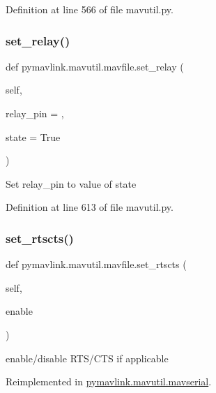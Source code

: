 Definition at line 566 of file mavutil.\+py.

\mbox{\label{classpymavlink_1_1mavutil_1_1mavfile_adefc4e0924a50a82a42a49e790cfe19a}} 
\subsubsection{\texorpdfstring{set\_relay()}{set\_relay()}}
{\footnotesize\ttfamily def pymavlink.\+mavutil.\+mavfile.\+set\+\_\+relay (\begin{DoxyParamCaption}\item[{}]{self,  }\item[{}]{relay\+\_\+pin = {},  }\item[{}]{state = {\ttfamily True} }\end{DoxyParamCaption})}

\begin{DoxyVerb}Set relay_pin to value of state\end{DoxyVerb}
 

Definition at line 613 of file mavutil.\+py.

\mbox{\label{classpymavlink_1_1mavutil_1_1mavfile_a2607aae0fda1190034889d9e1c585539}} 
\subsubsection{\texorpdfstring{set\_rtscts()}{set\_rtscts()}}
{\footnotesize\ttfamily def pymavlink.\+mavutil.\+mavfile.\+set\+\_\+rtscts (\begin{DoxyParamCaption}\item[{}]{self,  }\item[{}]{enable }\end{DoxyParamCaption})}

\begin{DoxyVerb}enable/disable RTS/CTS if applicable\end{DoxyVerb}
 

Reimplemented in \mbox{\hyperlink{classpymavlink_1_1mavutil_1_1mavserial_af4a1da9b197ebf58110e26b805af1fda}{pymavlink.\+mavutil.\+mavserial}}.



